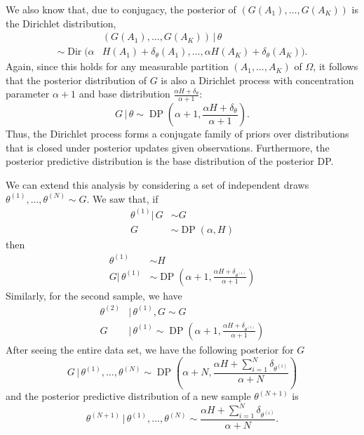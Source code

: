 \documentclass[final,3p,times,twocolumn]{elsarticle}
\DeclareMathOperator*{\Dir}{Dir}
\DeclareMathOperator*{\DP}{DP}
\begin{document}
We also know that, due to conjugacy, the posterior of $(G(A_1),\dots,G(A_K))$ is the Dirichlet distribution,
\begin{equation*}
\begin{split}
&(G(A_1),\dots,G(A_K))\,|\,\theta \\
\sim \Dir(\alpha &H(A_1) + \delta_\theta (A_1), \dots, \alpha H(A_K) + \delta_\theta (A_K)).
\end{split}
\end{equation*}
Again, since this holds for any measurable partition $(A_1,\dots,A_K)$ of $\Omega$, it follows that the posterior distribution of $G$ is also a Dirichlet process with concentration parameter $\alpha+1$ and base distribution $\frac{\alpha H + \delta_\theta}{\alpha + 1}$:
\begin{equation*}
G\,|\,\theta \sim \DP\left(\alpha + 1, \frac{\alpha H + \delta_\theta}{\alpha + 1}\right).
\end{equation*}
Thus, the Dirichlet process forms a conjugate family of priors over distributions that is closed under posterior updates given observations.
Furthermore, the posterior predictive distribution is the base distribution of the posterior DP.

We can extend this analysis by considering a set of independent draws $\theta^{(1)},\dots,\theta^{(N)} \sim G$.
We saw that, if 
\begin{equation*}
\begin{split}
\theta^{(1)}|\,G &\sim G\\
G &\sim \DP\left(\alpha,H\right)
\end{split}
\end{equation*}
then 
\begin{equation*}
\begin{split}
\theta^{(1)} &\sim H\\
G|\,\theta^{(1)} &\sim \DP\left(\alpha+1,\frac{\alpha H + \delta_{\theta^{(1)}}}{\alpha+1}\right)
\end{split}
\end{equation*}
Similarly, for the second sample, we have
\begin{equation*}
\begin{split}
\theta^{(2)}&|\,\theta^{(1)},G \sim G\\
G&|\,\theta^{(1)} \sim \DP\left(\alpha+1,\frac{\alpha H + \delta_{\theta^{(1)}}}{\alpha+1}\right)
\end{split}
\end{equation*}
After seeing the entire data set, we have the following posterior for $G$
\begin{equation*}
G\,|\,\theta^{(1)},\dots,\theta^{(N)} \sim \DP\left(\alpha+N,\frac{\alpha H + \sum_{i=1}^N \delta_{\theta^{(i)}}}{\alpha+N}\right)
\end{equation*}
and the posterior predictive distribution of a new sample $\theta^{(N+1)}$ is 
\begin{equation}
\label{eqn:dppostpred}
\theta^{(N+1)}\,|\,\theta^{(1)},\dots,\theta^{(N)} \sim \frac{\alpha H + \sum_{i=1}^N \delta_{\theta^{(i)}}}{\alpha+N}.
\end{equation}
\end{document}
